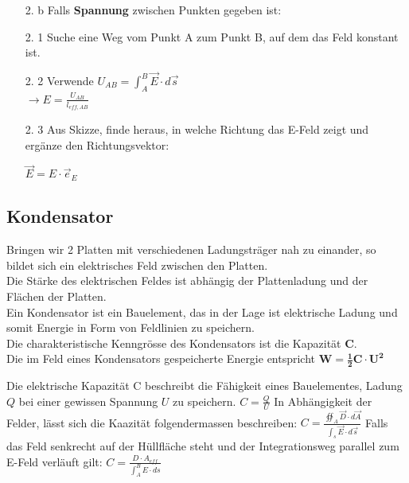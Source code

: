\iend
\begin{itemize}
	\item [2. b] Falls \textbf{Spannung} zwischen Punkten gegeben ist:\\

	\end{itemize}
	\beginip
	\begin{itemize}

	\item [2. 1]  Suche eine Weg vom Punkt A zum Punkt B, auf dem das Feld konstant ist. \\

	\item [2. 2] Verwende $\displaystyle U_{AB} = \int_A^B \vec{E}\cdot d\vec{s}$ \\
	$\displaystyle \rightarrow E = \frac{U_{AB}}{l_{eff,AB}}$

	\item [2. 3] Aus Skizze, finde heraus, in welche Richtung das E-Feld zeigt und ergänze den Richtungsvektor:
	\begin{center}
		$\vec{E} = E \cdot \vec{e}_E$
	\end{center}
	\end{itemize}
	\iend
\iend

\subsection{Kondensator}
Bringen wir 2 Platten mit verschiedenen Ladungsträger nah zu einander, so bildet sich ein elektrisches Feld zwischen den Platten. \\
Die Stärke des elektrischen Feldes ist abhängig der Plattenladung und der Flächen der Platten. \\
\beginip
Ein Kondensator ist ein Bauelement, das in der Lage ist elektrische Ladung und somit Energie in Form von Feldlinien zu speichern. \\
Die charakteristische Kenngrösse des Kondensators ist die Kapazität \textbf{C}. \\
Die im Feld eines Kondensators gespeicherte Energie entspricht $\mathbf{W = \frac{1}{2} C \cdot U^2}$ \\
\iend



\beginip
Die elektrische Kapazität C beschreibt die Fähigkeit eines Bauelementes, Ladung $Q$ bei einer gewissen Spannung $U$ zu speichern.
\formulaBegin
$C =\displaystyle \frac{Q}{U}$
\formulaEnd
In Abhängigkeit der Felder, lässt sich die Kaazität folgendermassen beschreiben:
\formulaBegin
$ C = \displaystyle \frac{\oiint_A \vec{D} \cdot d \vec{A} }{ \int_s \vec{E} \cdot d\vec{s}}$
\formulaEnd
Falls das Feld senkrecht auf der Hüllfläche steht und der Integrationsweg parallel zum E-Feld verläuft gilt:
\formulaBegin
$ C= \displaystyle \frac{D \cdot A_{eff} } {\int_A^B E \cdot ds} $
\formulaEnd
\iend


